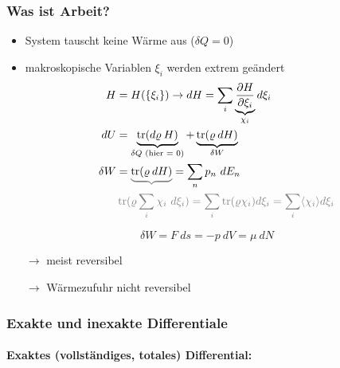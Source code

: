 \subsubsection{Was ist Arbeit?}
\begin{itemize}
    \item System tauscht keine Wärme aus ($\delta Q = 0$)
    \item makroskopische Variablen $\xi_i$ werden extrem geändert
    \begin{align}
        H &= H(\{\xi_i\}) \rightarrow dH = \sum_i \underbrace{\pd{H}{\xi_i}}_{\chi_i} d\xi_i \\
        dU &= \underbrace{\trace(d\varrho \: H)}_{\delta Q \text{ (hier = 0)}} + \underbrace{\trace(\varrho \: dH)}_{\delta W} \\
        \delta W &= \color{black!50} \underbrace{\color{black}\trace(\varrho \: dH) \color{black!50}} \color{black} = \sum_n p_n \ dE_n \\
        & \color{black!50} \trace(\varrho \sum_i \chi_i \ d\xi_i) = \sum_i \trace(\varrho \chi_i) d\xi_i = \sum_i \langle \chi_i \rangle d\xi_i
    \end{align}
\end{itemize}

\begin{center}
\end{center}
\begin{equation}
    \delta W = F \ ds = - p \ dV = \mu \ dN
\end{equation}
\vspace{1cm}
\begin{itemize}
    \item[$\longrightarrow$] meist reversibel
    \item[$\longrightarrow$] Wärmezufuhr nicht reversibel 
\end{itemize}



\subsubsection{Exakte und inexakte Differentiale}
\paragraph{Exaktes (vollständiges, totales) Differential:}

